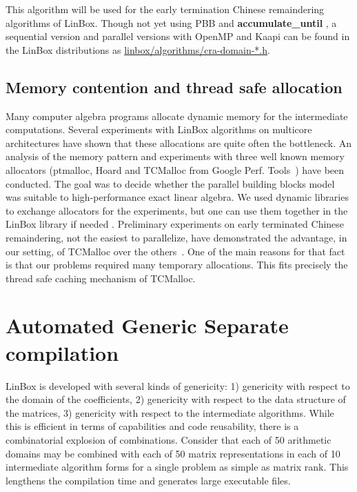 \documentclass{article}
\newcommand{\linbox}{{\sc LinBox}\xspace}
\newcommand{\accumulatewhile}{ \textbf{accumulate\_until} }
\begin{document}
This algorithm will be used 
for the early termination Chinese remaindering algorithms of
\linbox. Though not yet using PBB and \accumulatewhile, a
sequential version and parallel versions with OpenMP and
Kaapi can be found in the \linbox distributions as 
\url{linbox/algorithms/cra-domain-*.h}.



\subsection{Memory contention and thread safe allocation}
Many computer algebra programs allocate dynamic memory for the
intermediate computations. Several experiments with \linbox
algorithms on multicore architectures have shown that these
allocations are quite often the bottleneck.
An analysis of the memory pattern and experiments with three well
known memory allocators 
(ptmalloc, Hoard and TCMalloc from Google Perf. Tools~\cite{tcmalloc})
have been conducted. The goal was to decide whether the parallel
building blocks model was suitable to high-performance exact linear
algebra. We used dynamic libraries to exchange allocators for the
experiments, but one can use them together in the \linbox library if
needed \cite[\S 7]{kaltofen:2005:memory}.
%
Preliminary experiments on early terminated Chinese remaindering,
not the easiest to parallelize, have demonstrated the advantage, in
our setting, of TCMalloc over the others~\cite{jgd:2010:crt}.
One of the main reasons for that fact is that our problems required
many temporary allocations. This fits precisely the thread safe caching
mechanism of TCMalloc.
%
\section{Automated Generic Separate compilation}
\linbox is developed with several kinds of genericity:
1) genericity with respect to the domain of the coefficients,
2) genericity with respect to the data structure of the matrices,
3) genericity with respect to the intermediate algorithms.
While this is efficient in terms of capabilities and code reusability, there is a combinatorial explosion of combinations.  Consider that each of 50 arithmetic domains may be combined with each of 50 matrix representations in each of 10 intermediate algorithm forms for a single problem as simple as matrix rank. This
lengthens the compilation time and generates large executable files.
\end{document}
